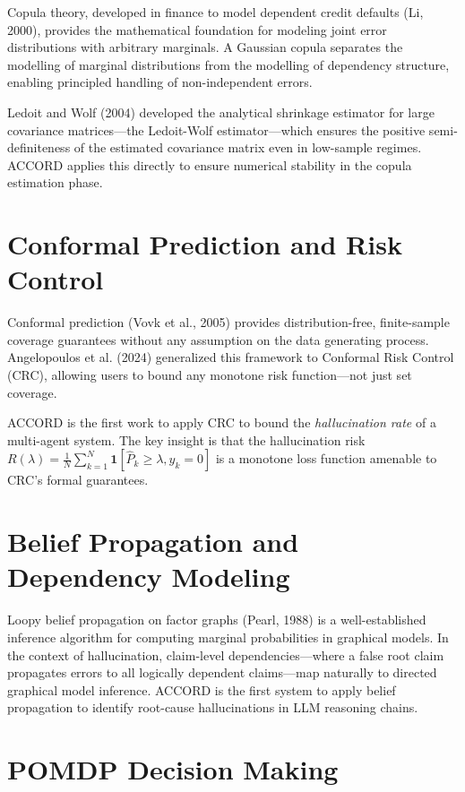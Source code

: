 \documentclass[12pt,a4paper]{report}
\begin{document}
Copula theory, developed in finance to model dependent credit defaults (Li, 2000), provides the mathematical foundation for modeling joint error distributions with arbitrary marginals. A Gaussian copula separates the modelling of marginal distributions from the modelling of dependency structure, enabling principled handling of non-independent errors.

Ledoit and Wolf (2004) developed the analytical shrinkage estimator for large covariance matrices---the Ledoit-Wolf estimator---which ensures the positive semi-definiteness of the estimated covariance matrix even in low-sample regimes. ACCORD applies this directly to ensure numerical stability in the copula estimation phase.

\section{Conformal Prediction and Risk Control}

Conformal prediction (Vovk et al., 2005) provides distribution-free, finite-sample coverage guarantees without any assumption on the data generating process. Angelopoulos et al. (2024) generalized this framework to Conformal Risk Control (CRC), allowing users to bound any monotone risk function---not just set coverage.

ACCORD is the first work to apply CRC to bound the \emph{hallucination rate} of a multi-agent system. The key insight is that the hallucination risk $R(\lambda) = \frac{1}{N}\sum_{k=1}^{N} \mathbf{1}[\hat{P}_k \geq \lambda, y_k = 0]$ is a monotone loss function amenable to CRC's formal guarantees.

\section{Belief Propagation and Dependency Modeling}

Loopy belief propagation on factor graphs (Pearl, 1988) is a well-established inference algorithm for computing marginal probabilities in graphical models. In the context of hallucination, claim-level dependencies---where a false root claim propagates errors to all logically dependent claims---map naturally to directed graphical model inference. ACCORD is the first system to apply belief propagation to identify root-cause hallucinations in LLM reasoning chains.

\section{POMDP Decision Making}
\end{document}
